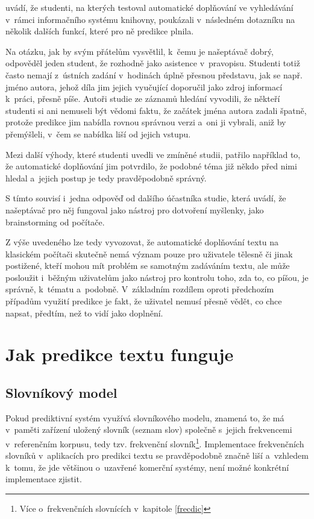 \documentclass[a4paper,11pt,openany]{book} %
\begin{document}
\parencite{ward2012autocomplete} uvádí, že studenti, na kterých testoval automatické doplňování ve vyhledávání v~rámci informačního systému knihovny, poukázali v~následném dotazníku na několik dalších funkcí, které pro ně predikce plnila.

Na otázku, jak by svým přátelům vysvětlil, k~čemu je našeptávač dobrý, odpověděl jeden student, že rozhodně jako asistence v~pravopisu. Studenti totiž často nemají z~ústních zadání v~hodinách úplně přesnou představu, jak se např. jméno autora, jehož díla jim jejich vyučující doporučil jako zdroj informací k~práci, přesně píše. Autoři studie ze záznamů hledání vyvodili, že někteří studenti si ani nemuseli být vědomi faktu, že začátek jména autora zadali špatně, protože predikce jim nabídla rovnou správnou verzi a~oni ji vybrali, aniž by přemýšleli, v~čem se nabídka liší od jejich vstupu. 

Mezi další výhody, které studenti uvedli ve zmíněné studii, patřilo například to, že automatické doplňování jim potvrdilo, že podobné téma již někdo před nimi hledal a~jejich postup je tedy pravděpodobně správný. 

S tímto souvisí i~jedna odpověď od dalšího účastníka studie, která uvádí, že našeptávač pro něj fungoval jako nástroj pro dotvoření myšlenky, jako brainstorming od počítače. 

Z výše uvedeného lze tedy vyvozovat, že automatické doplňování textu na klasickém počítači skutečně nemá význam pouze pro uživatele tělesně či jinak postižené, kteří mohou mít problém se samotným zadáváním textu, ale může posloužit i~běžným uživatelům jako nástroj pro kontrolu toho, zda to, co píšou, je správně, k~tématu a~podobně. V~základním rozdílem oproti předchozím případům využití predikce je fakt, že uživatel nemusí přesně vědět, co chce napsat, předtím, než to vidí jako doplnění.

\chapter{Jak predikce textu funguje}

\section{Slovníkový model}

Pokud prediktivní systém využívá slovníkového modelu, znamená to, že má v~paměti zařízení uložený slovník (seznam slov) společně s~jejich frekvencemi v~referenčním korpusu, tedy tzv. frekvenční slovník\footnote{Více o~frekvenčních slovnících v~kapitole \ref{frecdic}}. %
Implementace frekvenčních slovníků v~aplikacích pro predikci textu se pravděpodobně značně liší a~vzhledem k~tomu, že jde většinou o~uzavřené komerční systémy, není možné konkrétní implementace zjistit. \parencite{alanhenry2014}
\end{document}
